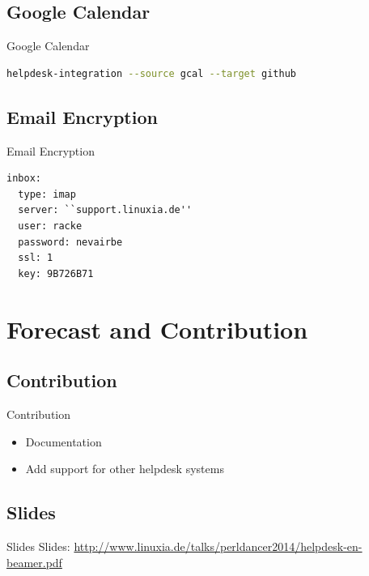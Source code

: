 \subsection{Google Calendar}

\begin{frame}[fragile]{Google Calendar}
\begin{lstlisting}[language=bash]
helpdesk-integration --source gcal --target github
\end{lstlisting}
\end{frame}

\subsection{Email Encryption}
\begin{frame}[fragile]{Email Encryption}
\begin{lstlisting}
inbox:
  type: imap
  server: ``support.linuxia.de''
  user: racke
  password: nevairbe
  ssl: 1
  key: 9B726B71
\end{lstlisting}
\end{frame}

\section{Forecast and Contribution}

\subsection{Contribution}
\begin{frame}{Contribution}
\begin{itemize}
\item Documentation
\item Add support for other helpdesk systems
\end{itemize}
\end{frame}

\subsection{Slides}

\begin{frame}{Slides}
Slides:
\url{http://www.linuxia.de/talks/perldancer2014/helpdesk-en-beamer.pdf}
\end{frame}



